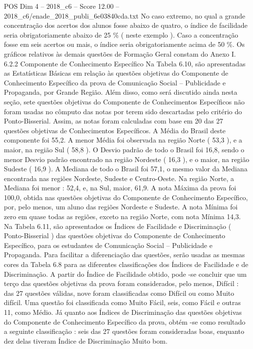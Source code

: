 \begin{textsample}{POS Dim 4 – 2018\_c6 – Score 12.00 – 2018\_c6/enade\_2018\_publi\_6e03840cda.txt}
No caso extremo, no qual a grande concentração dos acertos dos alunos fosse abaixo de quatro, o índice de facilidade seria obrigatoriamente abaixo de 25 \% ( neste exemplo ).
Caso a concentração fosse em seis acertos ou mais, o índice seria obrigatoriamente acima de 50 \%.
Os gráficos relativos às demais questões de Formação Geral constam do Anexo I. 6.2.2 Componente de Conhecimento Específico Na Tabela 6.10, são apresentadas as Estatísticas Básicas em relação às questões objetivas do Componente de Conhecimento Específico da prova de Comunicação Social – Publicidade e Propaganda, por Grande Região.
Além disso, como será discutido ainda nesta seção, sete questões objetivas do Componente de Conhecimentos Específicos não foram usadas no cômputo das notas por terem sido descartadas pelo critério do Ponto-Bisserial.
Assim, as notas foram calculadas com base em 20 das 27 questões objetivas de Conhecimentos Específicos.
A Média do Brasil deste componente foi 55,2.
A menor Média foi observada na região Norte ( 53,3 ), e a maior, na região Sul ( 58,8 ).
O Desvio padrão de todo o Brasil foi 16,8, sendo o menor Desvio padrão encontrado na região Nordeste ( 16,3 ), e o maior, na região Sudeste ( 16,9 ).
A Mediana de todo o Brasil foi 57,1, o mesmo valor da Mediana encontrada nas regiões Nordeste, Sudeste e Centro-Oeste.
Na região Norte, a Mediana foi menor : 52,4, e, na Sul, maior, 61,9.
A nota Máxima da prova foi 100,0, obtida nas questões objetivas do Componente de Conhecimento Específico, por, pelo menos, um aluno das regiões Nordeste e Sudeste.
A nota Mínima foi zero em quase todas as regiões, exceto na região Norte, com nota Mínima 14,3.
Na Tabela 6.11, são apresentados os Índices de Facilidade e Discriminação ( Ponto-Bisserial ) das questões objetivas do Componente de Conhecimento Específico, para os estudantes de Comunicação Social – Publicidade e Propaganda.
Para facilitar a diferenciação das questões, serão usadas as mesmas cores da Tabela 6.8 para as diferentes classificações dos Índices de Facilidade e de Discriminação.
A partir do Índice de Facilidade obtido, pode -se concluir que um terço das questões objetivas da prova foram considerados, pelo menos, Difícil : das 27 questões válidas, nove foram classificadas como Difícil ou como Muito difícil.
Uma questão foi classificada como Muito Fácil, seis, como Fácil e outras 11, como Médio.
Já quanto aos Índices de Discriminação das questões objetivas do Componente de Conhecimento Específico da prova, obtém -se como resultado a seguinte classificação : seis das 27 questões foram consideradas boas, enquanto dez delas tiveram Índice de Discriminação Muito bom.

\end{textsample}
